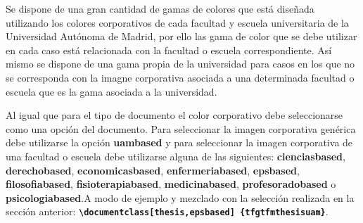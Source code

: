 
Se dispone de una gran cantidad de gamas de colores que está diseñada utilizando los colores corporativos de cada facultad y escuela universitaria de la Universidad Autónoma de Madrid, por ello las gama de color que se debe utilizar en cada caso está relacionada con la facultad o escuela correspondiente. Así mismo se dispone de una gama propia de la universidad para casos en los que no se corresponda con la imagne corporativa asociada a una determinada facultad o escuela que es la gama asociada a la universidad.

Al igual que para el tipo de documento el color corporativo debe seleccionarse como una opción del documento. Para seleccionar la imagen corporativa genérica debe utilizarse la opción \textbf{uambased} y para seleccionar la imagen corporativa de una facultad o escuela debe utilizarse alguna de las siguientes: \textbf{cienciasbased}, \textbf{derechobased}, \textbf{economicasbased}, \textbf{enfermeriabased}, \textbf{epsbased}, \textbf{filosofiabased}, \textbf{fisioterapiabased}, \textbf{medicinabased}, \textbf{profesoradobased} o \textbf{psicologiabased}.A modo de ejemplo y mezclado con la selección realizada en la sección anterior: \textbf{\texttt{{\textbackslash}documentclass[thesis,epsbased] \{tfgtfmthesisuam\}}}.
